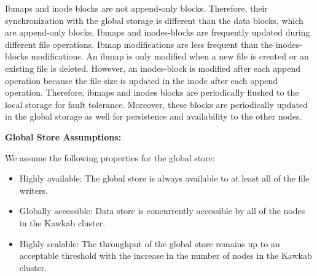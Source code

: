 \documentclass[]{article}
\newcommand{\subtopic}[1]{\vspace{1.5pt} \noindent \textbf{#1}}
\begin{document}
Ibmaps and inode blocks are not append-only blocks. Therefore, their
synchronization with the global storage is different than the data blocks,
which are append-only blocks. Ibmaps and inodes-blocks are frequently updated
during different file operations. Ibmap modifications are less frequent than
the inodes-blocks modifications. An ibmap is only modified when a new file is
created or an existing file is deleted.  However, an inodes-block is modified
after each append operation because the file size is updated in
the inode after each append operation. Therefore, ibmaps and inodes blocks are
periodically flushed to the local storage for fault tolerance.  Moreover, these
blocks are periodically updated in the global storage as well for persistence
and availability to the other nodes.


\subtopic{Global Store Assumptions:}

We assume the following properties for the global store:

\begin{itemize}

\item Highly available: The global store is always available to at least all
  of the file writers.

\item Globally accessible: Data store is concurrently accessible by all of the nodes
  in the Kawkab cluster.

\item Highly scalable: The throughput of the global store remains up to an
acceptable threshold with the increase in the number of nodes in the Kawkab cluster.

\end{itemize}





%
%
%
%
\end{document}
